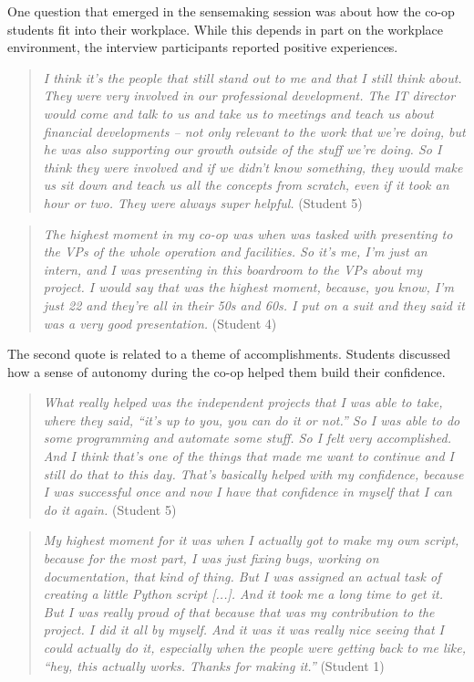 \documentclass{article}
\begin{document}
One question that emerged in the sensemaking session was about how the co-op students fit into their workplace. While this depends in part on the workplace environment, the interview participants reported positive experiences.

\begin{quote}
    \textit{I think it's the people that still stand out to me and that I still think about. They were very involved in our professional development. The IT director would come and talk to us and take us to meetings and teach us about financial developments – not only relevant to the work that we're doing, but he was also supporting our growth outside of the stuff we're doing. So I think they were involved and if we didn't know something, they would make us sit down and teach us all the concepts from scratch, even if it took an hour or two. They were always super helpful.} (Student 5)
\end{quote}

\begin{quote}
    \textit{The highest moment in my co-op was when was tasked with presenting to the VPs of the whole operation and facilities. So it's me, I'm just an intern, and I was presenting in this boardroom to the VPs about my project. I would say that was the highest moment, because, you know, I'm just 22 and they're all in their 50s and 60s. I put on a suit and they said it was a very good presentation.} (Student 4)
\end{quote}

The second quote is related to a theme of accomplishments. Students discussed how a sense of autonomy during the co-op helped them build their confidence.


\begin{quote}
    \textit{What really helped was the independent projects that I was able to take, where they said, “it's up to you, you can do it or not.” So I was able to do some programming and automate some stuff. So I felt very accomplished. And I think that's one of the things that made me want to continue and I still do that to this day. That's basically helped with my confidence, because I was successful once and now I have that confidence in myself that I can do it again.} (Student 5)
\end{quote}

\begin{quote}
    \textit{My highest moment for it was when I actually got to make my own script, because for the most part, I was just fixing bugs, working on documentation, that kind of thing. But I was assigned an actual task of creating a little Python script [...]. And it took me a long time to get it. But I was really proud of that because that was my contribution to the project. I did it all by myself. And it was it was really nice seeing that I could actually do it, especially when the people were getting back to me like, “hey, this actually works. Thanks for making it.”} (Student 1)
\end{quote}
\end{document}
